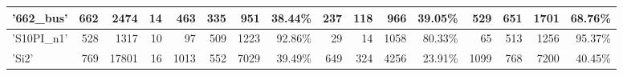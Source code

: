 \begin{table}[]
{\begin{tabular}{|l|r|r|r|r|r|r|r|r|r|r|r|r|r|r|r|}
\hline \hline
'662\_bus'                    & 662                                                     & 2474                                                & 14                                                       & 463                     & 335                     & 951                                                                           & 38.44\%                                                                          & 237                     & 118                     & 966                                                                            & 39.05\%                                                                          & 529                     & 651                     & 1701                                                                           & 68.76\%                                                                           \\ 
\hline
'S10PI\_n1'                   & 528                                                     & 1317                                                & 10                                                       & 97                      & 509                     & 1223                                                                          & 92.86\%                                                                          & 29                      & 14                      & 1058                                                                           & 80.33\%                                                                          & 65                      & 513                     & 1256                                                                           & 95.37\%                                                                           \\ 
\hline
'Si2'                         & 769                                                     & 17801                                               & 16                                                       & 1013                    & 552                     & 7029                                                                          & 39.49\%                                                                          & 649                     & 324                     & 4256                                                                           & 23.91\%                                                                          & 1099                    & 768                     & 7200                                                                           & 40.45\%                                                                           \\ 

\end{tabular}}
\end{table}
